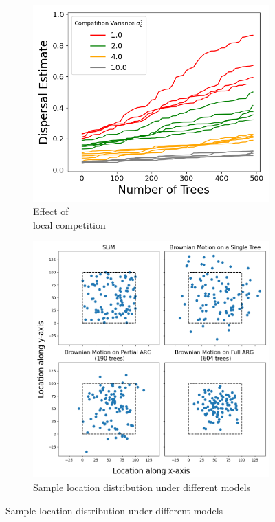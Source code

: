\begin{figure}[H]
\begin{subfigure}{0.32\textwidth}
    \caption{\centering Effect of \\ local competition}
    \includegraphics[width=\linewidth]{Images/Figure5_DispersalRate/DispRateComp.png}
\end{subfigure}
\begin{center}
\begin{subfigure}{0.75\textwidth}
    \caption{\centering Sample location distribution under different models}
    \includegraphics[width=\linewidth]{Images/Figure5_DispersalRate/DispPattern.png}
\end{subfigure}    
\end{center}


\end{figure}

